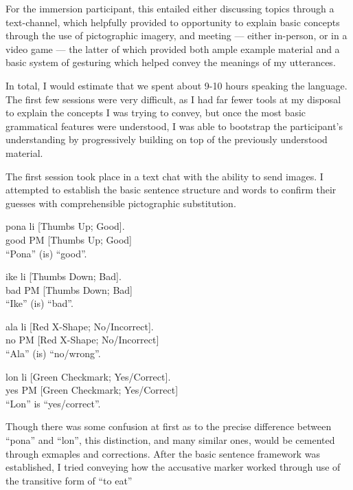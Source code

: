 \documentclass[a4paper,10pt]{article}
\begin{document}
For the immersion participant, this entailed either discussing topics through a text-channel, which
helpfully provided to opportunity to explain basic concepts through the use of pictographic imagery,
and meeting --- either in-person, or in a video game --- the latter of which provided both ample
example material and a basic system of gesturing which helped convey the meanings of my utterances.

In total, I would estimate that we spent about 9-10 hours speaking the language. The first few sessions
were very difficult, as I had far fewer tools at my disposal to explain the concepts I was trying to
convey, but once the most basic grammatical features were understood, I was able to bootstrap the
participant's understanding by progressively building on top of the previously understood material.

The first session took place in a text chat with the ability to send images. I attempted to establish
the basic sentence structure and words to confirm their guesses with comprehensible pictographic
substitution.

\begin{exe}
 \ex
 \gll pona li [Thumbs Up; Good]. \\
 good PM [Thumbs Up; Good] \\
 \glt ``Pona'' (is) ``good''.
\end{exe}
\begin{exe}
 \ex
 \gll ike li [Thumbs Down; Bad]. \\
 bad PM [Thumbs Down; Bad] \\
 \glt ``Ike'' (is) ``bad''.
\end{exe}
\begin{exe}
 \ex
 \gll ala li [Red X-Shape; No/Incorrect]. \\
 no PM [Red X-Shape; No/Incorrect] \\
 \glt ``Ala'' (is) ``no/wrong''.
\end{exe}
\begin{exe}
 \ex
 \gll lon li [Green Checkmark; Yes/Correct]. \\
 yes PM [Green Checkmark; Yes/Correct] \\
 \glt ``Lon'' is ``yes/correct''.
\end{exe}

Though there was some confusion at first as to the precise difference between ``pona'' and ``lon'',
this distinction, and many similar ones, would be cemented through exmaples and corrections. After
the basic sentence framework was established, I tried conveying how the accusative marker worked
through use of the transitive form of ``to eat''
\end{document}
